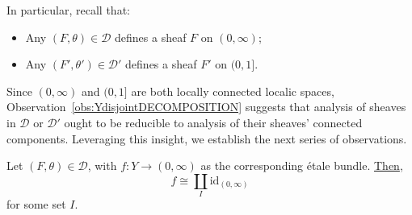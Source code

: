 \documentclass[a4paper, 11pt,reqno]{amsart}
\newcommand{\id}{\mathrm{id}}
\newcommand{\D}{\mathcal{D}}
\begin{document}
In particular, recall that:
\begin{itemize}
	\item Any $(F,\theta)\in\D$  defines a sheaf $F$ on $(0,\infty)$;
	\item Any $(F',\theta')\in\D'$ defines a sheaf $F'$ on $(0,1]$. 
\end{itemize}
Since $(0,\infty)$ and $(0,1]$ are both locally connected localic spaces, Observation~\ref{obs:YdisjointDECOMPOSITION} suggests that analysis of sheaves in $\D$ or $\D'$ 
ought to be reducible to analysis of their sheaves' connected components. Leveraging this insight, we establish the next series of observations.

\begin{observation}\label{obs:connNAsheaf} Let $(F,\theta)\in\D$, with $f\colon Y\to (0,\infty)$ as the corresponding \'{e}tale bundle. \underline{Then}, 
		\[f\cong \coprod_{I} \id_{(0,\infty)}\]
for some set $I$. 		
\end{observation}
\end{document}

